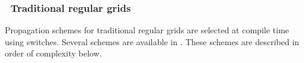 \vssub
\subsubsection{~Traditional regular grids} \label{sub:num_space_trad}

\noindent
Propagation schemes for traditional regular grids are selected at compile time
using switches.  Several schemes are available in \ws. These schemes are
described in order of complexity below.
